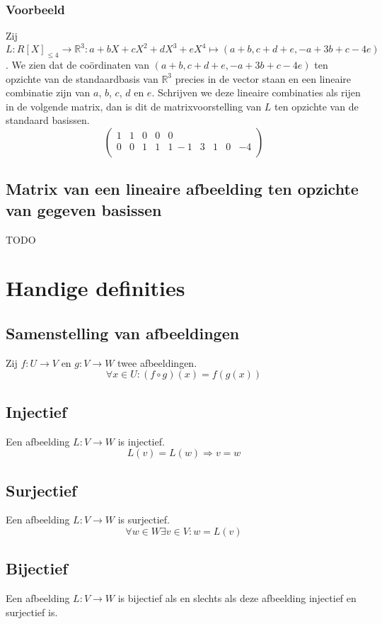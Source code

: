 \documentclass[lineaire_algebra_oplossingen.tex]{subfiles}
\begin{document}
\subsubsection*{Voorbeeld}
Zij $L:R[X]_{\le 4}\rightarrow \mathbb{R}^3: a+bX+cX^2+dX^3+eX^4\mapsto (a+b,c+d+e,-a+3b+c-4e)$.
We zien dat de co\"ordinaten van $(a+b,c+d+e,-a+3b+c-4e)$ ten opzichte van de standaardbasis van $\mathbb{R}^3$ precies in de vector staan en een lineaire combinatie zijn van $a$, $b$, $c$, $d$ en $e$.
Schrijven we deze lineaire combinaties als rijen in de volgende matrix, dan is dit de matrixvoorstelling van $L$ ten opzichte van de standaard basissen.
\[
\begin{pmatrix}
1 & 1 & 0 & 0 & 0\\
0 & 0 & 1 & 1 & 1\
-1 & 3 & 1 & 0 & -4\\
\end{pmatrix}
\]

\subsection{Matrix van een lineaire afbeelding ten opzichte van gegeven basissen}
\label{matrix_van_lineaire_afbeeldingen_tov_gegeven_basissen}
TODO

\section{Handige definities}
\subsection{Samenstelling van afbeeldingen}
\label{samenstelling_van_afbeeldingen}
Zij $f: U \rightarrow V$ en $g: V\rightarrow W$ twee afbeeldingen.
\[
\forall x\in U: (f \circ g)(x) = f(g(x))
\]
\subsection{Injectief}
\label{injectief}
Een afbeelding $L: V \rightarrow W$ is injectief.
\[
L(v) = L(w) \Rightarrow v = w
\]
\subsection{Surjectief}
\label{surjectief}
Een afbeelding $L: V \rightarrow W$ is surjectief.
\[
\forall w \in W \exists v \in V: w=L(v)
\]
\subsection{Bijectief}
\label{bijectief}
Een afbeelding $L: V \rightarrow W$ is bijectief als en slechts als deze afbeelding injectief en surjectief is.
\end{document}
